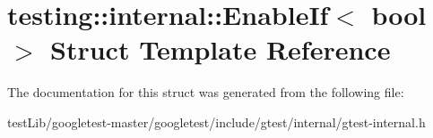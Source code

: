 \hypertarget{structtesting_1_1internal_1_1EnableIf}{}\section{testing\+:\+:internal\+:\+:Enable\+If$<$ bool $>$ Struct Template Reference}
\label{structtesting_1_1internal_1_1EnableIf}


The documentation for this struct was generated from the following file\+:\begin{DoxyCompactItemize}
\item 
test\+Lib/googletest-\/master/googletest/include/gtest/internal/gtest-\/internal.\+h\end{DoxyCompactItemize}
